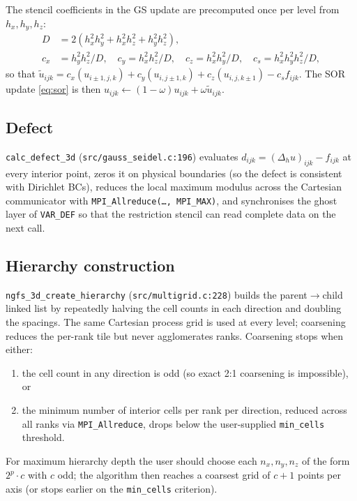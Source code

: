 \documentclass[11pt]{article}
\theoremstyle{definition}
\begin{document}
The stencil coefficients in the GS update are precomputed once per
level from $h_x,h_y,h_z$:
\begin{align*}
  D &= 2(h_x^2 h_y^2 + h_x^2 h_z^2 + h_y^2 h_z^2),\\
  c_x &= h_y^2 h_z^2 / D, \quad
  c_y = h_x^2 h_z^2 / D, \quad
  c_z = h_x^2 h_y^2 / D, \quad
  c_s = h_x^2 h_y^2 h_z^2 / D,
\end{align*}
so that
$\widetilde u_{ijk} = c_x(u_{i\pm 1,j,k}) + c_y(u_{i,j\pm 1,k}) + c_z(u_{i,j,k\pm 1})
- c_s f_{ijk}$.
The SOR update \eqref{eq:sor} is then $u_{ijk} \leftarrow (1-\omega)u_{ijk}
+ \omega \widetilde u_{ijk}$.

\subsection{Defect}\label{sec:defect}
\texttt{calc\_defect\_3d} (\texttt{src/gauss\_seidel.c:196}) evaluates
$d_{ijk} = (\Delta_h u)_{ijk} - f_{ijk}$ at every interior point,
zeros it on physical boundaries (so the defect is consistent with
Dirichlet BCs), reduces the local maximum modulus across the Cartesian
communicator with \texttt{MPI\_Allreduce(\dots, MPI\_MAX)}, and
synchronises the ghost layer of \texttt{VAR\_DEF} so that the
restriction stencil can read complete data on the next call.

\subsection{Hierarchy construction}\label{sec:hierarchy}
\texttt{ngfs\_3d\_create\_hierarchy} (\texttt{src/multigrid.c:228}) builds
the parent$\to$child linked list by repeatedly halving the cell counts
in each direction and doubling the spacings.  The same Cartesian
process grid is used at every level; coarsening reduces the per-rank
tile but never agglomerates ranks.  Coarsening stops when either:
\begin{enumerate}[label=(\roman*),leftmargin=*]
  \item the cell count in any direction is odd (so exact 2:1 coarsening
    is impossible), or
  \item the minimum number of interior cells per rank per direction,
    reduced across all ranks via \texttt{MPI\_Allreduce}, drops below
    the user-supplied \texttt{min\_cells} threshold.
\end{enumerate}
For maximum hierarchy depth the user should choose each $n_x,n_y,n_z$
of the form $2^p\cdot c$ with $c$ odd; the algorithm then reaches a
coarsest grid of $c+1$ points per axis (or stops earlier on the
\texttt{min\_cells} criterion).
\end{document}
